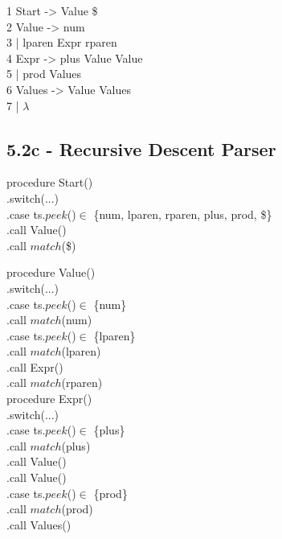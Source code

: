 \documentclass[letterpaper, 10pt,DIV=13]{scrartcl}
\numberwithin{equation}{section} %
\numberwithin{figure}{section} %
\numberwithin{table}{section} %
\begin{document}
1 Start -> Value \$ \\
2 Value -> num \\
3 \hspace{1cm} | lparen Expr rparen \\
4 Expr -> plus Value Value \\
5 \hspace{1cm} | prod Values \\
6 Values -> Value Values \\
7 \hspace{1cm} | $\lambda$

\subsection{5.2c - Recursive Descent Parser}

procedure Start() \\
.\hspace{1cm}switch(...)\\
.\hspace{2cm}case ts.$peek$()$\in$ \{num, lparen, rparen, plus, prod, \$\} \\
.\hspace{3cm}call Value() \\
.\hspace{3cm}call $match$(\$)

procedure Value() \\
.\hspace{1cm}switch(...)\\
.\hspace{2cm}case ts.$peek$()$\in$ \{num\} \\
.\hspace{3cm}call $match$(num) \\
.\hspace{2cm}case ts.$peek$()$\in$ \{lparen\} \\
.\hspace{3cm}call $match$(lparen) \\
.\hspace{3cm}call Expr() \\
.\hspace{3cm}call $match$(rparen) \\


procedure Expr() \\
.\hspace{1cm}switch(...)\\
.\hspace{2cm}case ts.$peek$()$\in$ \{plus\} \\
.\hspace{3cm}call $match$(plus) \\
.\hspace{3cm}call Value() \\
.\hspace{3cm}call Value() \\
.\hspace{2cm}case ts.$peek$()$\in$ \{prod\} \\
.\hspace{3cm}call $match$(prod) \\
.\hspace{3cm}call Values() \\
\end{document}
